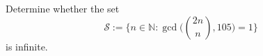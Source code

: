 Determine whether the set
\[
  \mathcal{S}:=\{n\in\mathbb{N}: \gcd\!\bigl(\binom{2n}{n},105\bigr)=1\}
\]
is infinite.
